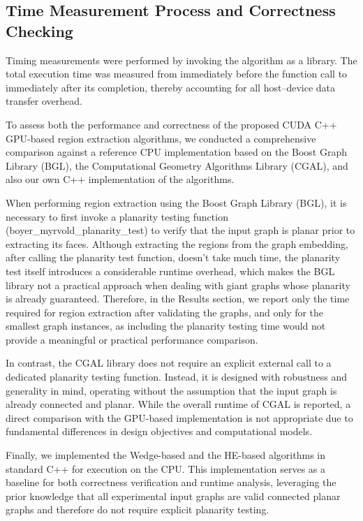 \documentclass[conference]{IEEEtran}
\begin{document}
\subsection{Time Measurement Process and Correctness Checking}
Timing measurements were performed by invoking the algorithm as a library. The total execution time was measured from immediately before the function call to immediately after its completion, thereby accounting for all host–device data transfer overhead.

To assess both the performance and correctness of the proposed CUDA C++ GPU-based region extraction algorithms, we conducted a comprehensive comparison against a reference CPU implementation based on the Boost Graph Library (BGL), the Computational Geometry Algorithms Library (CGAL), and also our own C++ implementation of the algorithms.

When performing region extraction using the Boost Graph Library (BGL), it is necessary to first invoke a planarity testing function (boyer\_myrvold\_planarity\_test) to verify that the input graph is planar prior to extracting its faces. Although extracting the regions from the graph embedding, after calling the planarity test function, doesn't take much time, the planarity test itself introduces a considerable runtime overhead, which makes the BGL library not a practical approach when dealing with giant graphs whose planarity is already guaranteed. Therefore, in the Results section, we report only the time required for region extraction after validating the graphs, and only for the smallest graph instances, as including the planarity testing time would not provide a meaningful or practical performance comparison.

In contrast, the CGAL library does not require an explicit external call to a dedicated planarity testing function. Instead, it is designed with robustness and generality in mind, operating without the assumption that the input graph is already connected and planar. While the overall runtime of CGAL is reported, a direct comparison with the GPU-based implementation is not appropriate due to fundamental differences in design objectives and computational models.

Finally, we implemented the Wedge-based and the HE-based algorithms in standard C++ for execution on the CPU. This implementation serves as a baseline for both correctness verification and runtime analysis, leveraging the prior knowledge that all experimental input graphs are valid connected planar graphs and therefore do not require explicit planarity testing.
\end{document}

